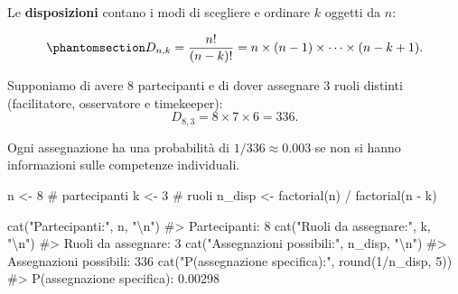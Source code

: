 \documentclass[
  letterpaper,
  DIV=11,
  numbers=noendperiod,
  oneside]{scrreprt}
\newenvironment{Shaded}{\begin{snugshade}}{\end{snugshade}}
\newcommand{\CommentTok}[1]{\textcolor[rgb]{0.37,0.37,0.37}{#1}}
\newcommand{\DecValTok}[1]{\textcolor[rgb]{0.68,0.00,0.00}{#1}}
\newcommand{\FunctionTok}[1]{\textcolor[rgb]{0.28,0.35,0.67}{#1}}
\newcommand{\NormalTok}[1]{\textcolor[rgb]{0.00,0.23,0.31}{#1}}
\newcommand{\OtherTok}[1]{\textcolor[rgb]{0.00,0.23,0.31}{#1}}
\newcommand{\SpecialCharTok}[1]{\textcolor[rgb]{0.37,0.37,0.37}{#1}}
\newcommand{\StringTok}[1]{\textcolor[rgb]{0.13,0.47,0.30}{#1}}
\theoremstyle{definition}
\theoremstyle{plain}
\theoremstyle{definition}
\theoremstyle{remark}
\begin{document}
Le \textbf{disposizioni} contano i modi di scegliere e ordinare \(k\)
oggetti da \(n\):

\begin{equation}\phantomsection\label{eq-dispositions-def}{
D_{n,k} = \frac{n!}{(n-k)!} = n \times (n-1) \times \cdots \times (n-k+1).
}\end{equation}

\begin{tcolorbox}[enhanced jigsaw, arc=.35mm, breakable, colbacktitle=quarto-callout-note-color!10!white, opacityback=0, toprule=.15mm, rightrule=.15mm, colback=white, opacitybacktitle=0.6, leftrule=.75mm, coltitle=black, bottomtitle=1mm, left=2mm, toptitle=1mm, title=\textcolor{quarto-callout-note-color}{\faInfo}\hspace{0.5em}{Esempio: assegnazione di ruoli in terapia di gruppo}, titlerule=0mm, bottomrule=.15mm, colframe=quarto-callout-note-color-frame]

Supponiamo di avere 8 partecipanti e di dover assegnare 3 ruoli distinti
(facilitatore, osservatore e timekeeper): \[
D_{8,3} = 8 \times 7 \times 6 = 336.
\]

Ogni assegnazione ha una probabilità di \(1/336 \approx 0.003\) se non
si hanno informazioni sulle competenze individuali.

\end{tcolorbox}

\begin{Shaded}
\begin{Highlighting}[]
\NormalTok{n }\OtherTok{\textless{}{-}} \DecValTok{8}  \CommentTok{\# partecipanti}
\NormalTok{k }\OtherTok{\textless{}{-}} \DecValTok{3}  \CommentTok{\# ruoli}
\NormalTok{n\_disp }\OtherTok{\textless{}{-}} \FunctionTok{factorial}\NormalTok{(n) }\SpecialCharTok{/} \FunctionTok{factorial}\NormalTok{(n }\SpecialCharTok{{-}}\NormalTok{ k)}

\FunctionTok{cat}\NormalTok{(}\StringTok{"Partecipanti:"}\NormalTok{, n, }\StringTok{"}\SpecialCharTok{\textbackslash{}n}\StringTok{"}\NormalTok{)}
\CommentTok{\#\textgreater{} Partecipanti: 8}
\FunctionTok{cat}\NormalTok{(}\StringTok{"Ruoli da assegnare:"}\NormalTok{, k, }\StringTok{"}\SpecialCharTok{\textbackslash{}n}\StringTok{"}\NormalTok{)}
\CommentTok{\#\textgreater{} Ruoli da assegnare: 3}
\FunctionTok{cat}\NormalTok{(}\StringTok{"Assegnazioni possibili:"}\NormalTok{, n\_disp, }\StringTok{"}\SpecialCharTok{\textbackslash{}n}\StringTok{"}\NormalTok{)}
\CommentTok{\#\textgreater{} Assegnazioni possibili: 336}
\FunctionTok{cat}\NormalTok{(}\StringTok{"P(assegnazione specifica):"}\NormalTok{, }\FunctionTok{round}\NormalTok{(}\DecValTok{1}\SpecialCharTok{/}\NormalTok{n\_disp, }\DecValTok{5}\NormalTok{))}
\CommentTok{\#\textgreater{} P(assegnazione specifica): 0.00298}
\end{Highlighting}
\end{Shaded}
\end{document}
